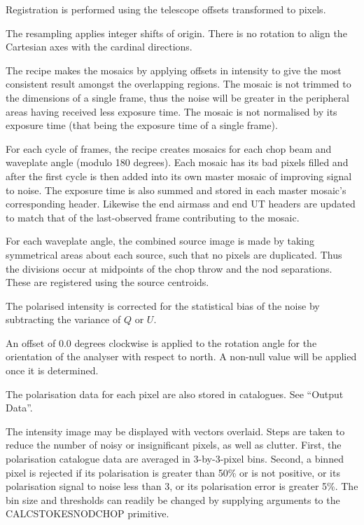 \documentclass[twoside,11pt]{article}
\newcommand{\htmlref}[2]{#1}
\renewcommand{\_}{\texttt{\symbol{95}}}
\newcommand{\sstitem}{\item}
\begin{document}
{{{         \sstitem
         Registration is performed using the telescope offsets
         transformed to pixels.

         \sstitem
         The resampling applies integer shifts of origin.   There is no
         rotation to align the Cartesian axes with the cardinal directions.

         \sstitem
         The recipe makes the mosaics by applying offsets in intensity
         to give the most consistent result amongst the overlapping regions.
         The mosaic is not trimmed to the dimensions of a single frame, thus
         the noise will be greater in the peripheral areas having received
         less exposure time.  The mosaic is not normalised by its exposure
         time (that being the exposure time of a single frame).

         \sstitem
         For each cycle of frames, the recipe creates mosaics for each
         chop beam and waveplate angle (modulo 180 degrees).  Each mosaic
         has its bad pixels filled and after the first cycle is then added
         into its own master mosaic of improving signal to noise.  The
         exposure time is also summed and stored in each master mosaic's
         corresponding header.  Likewise the end airmass and end UT headers
         are updated to match that of the last-observed frame contributing
         to the mosaic.

         \sstitem
         For each waveplate angle, the combined source image is made by
         taking symmetrical areas about each source, such that no pixels
         are duplicated.  Thus the divisions occur at midpoints of the chop
         throw and the nod separations.  These are registered using the
         source centroids.

         \sstitem
         The polarised intensity is corrected for the statistical bias
         of the noise by subtracting the variance of $Q$ or $U$.

         \sstitem
         An offset of 0.0 degrees clockwise is applied to the rotation
         angle for the orientation of the analyser with respect to north.
         A non-null value will be applied once it is determined.

         \sstitem
         The polarisation data for each pixel are also stored in
         catalogues.  See \htmlref{``Output Data''}{panc_data}.

         \sstitem
         The intensity image may be displayed with vectors overlaid.
         Steps are taken to reduce the number of noisy or insignificant
         pixels, as well as clutter.  First, the polarisation catalogue data
         are averaged in 3-by-3-pixel bins.  Second, a binned pixel is
         rejected if its polarisation is greater than 50\% or is not positive,
         or its polarisation signal to noise less than 3, or its polarisation
         error is greater 5\%.  The bin size and thresholds can readily be
         changed by supplying arguments to the \_CALC\_STOKES\_NOD\_CHOP\_
         primitive.

}}}
\end{document}
